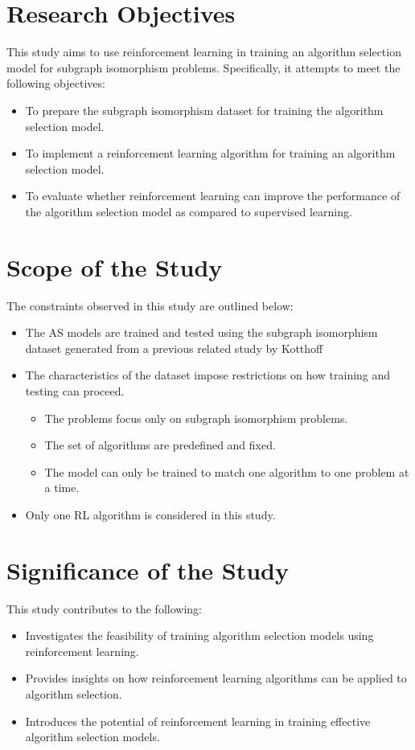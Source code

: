 \section{Research Objectives}
This study aims to use reinforcement learning in training an algorithm selection model for subgraph isomorphism problems. Specifically, it attempts to meet the following objectives:
\begin{itemize}
	\item To prepare the subgraph isomorphism dataset for training the algorithm selection model.
	\item To implement a reinforcement learning algorithm for training an algorithm selection model.
	\item To evaluate whether reinforcement learning can improve the performance of the algorithm selection model as compared to supervised learning.
\end{itemize}

\section{Scope of the Study}
The constraints observed in this study are outlined below:
\begin{itemize}
	\item The AS models are trained and tested using the subgraph isomorphism dataset generated from a previous related study by Kotthoff \citep{kotthoff2016portfolios}
	\item The characteristics of the dataset impose restrictions on how training and testing can proceed.
	\begin{itemize}
		\item The problems focus only on subgraph isomorphism problems.
		\item The set of algorithms are predefined and fixed.
		\item The model can only be trained to match one algorithm to one problem at a time.
	\end{itemize}
	\item Only one RL algorithm is considered in this study.
\end{itemize}

\section{Significance of the Study}
This study contributes to the following:

\begin{itemize}
	\item Investigates the feasibility of training algorithm selection models using reinforcement learning.
	\item Provides insights on how reinforcement learning algorithms can be applied to algorithm selection.
	\item Introduces the potential of reinforcement learning in training effective algorithm selection models.
\end{itemize}
